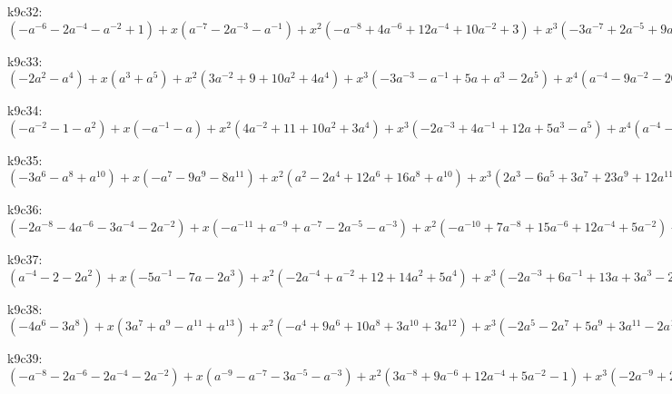 k9c32: $ (-a^{-6}-2a^{-4}-a^{-2}+1) +x(a^{-7}-2a^{-3}-a^{-1}) +x^{2}(-a^{-8}+4a^{-6}+12a^{-4}+10a^{-2}+3) +x^{3}(-3a^{-7}+2a^{-5}+9a^{-3}+3a^{-1}-a) +x^{4}(a^{-8}-6a^{-6}-18a^{-4}-19a^{-2}-8) +x^{5}(3a^{-7}-5a^{-5}-18a^{-3}-9a^{-1}+a) +x^{6}(5a^{-6}+7a^{-4}+6a^{-2}+4) +x^{7}(5a^{-5}+10a^{-3}+5a^{-1}) +x^{8}(2a^{-4}+2a^{-2}) $

k9c33: $ (-2a^{2}-a^{4}) +x(a^{3}+a^{5}) +x^{2}(3a^{-2}+9+10a^{2}+4a^{4}) +x^{3}(-3a^{-3}-a^{-1}+5a+a^{3}-2a^{5}) +x^{4}(a^{-4}-9a^{-2}-20-16a^{2}-6a^{4}) +x^{5}(4a^{-3}-5a^{-1}-16a-6a^{3}+a^{5}) +x^{6}(7a^{-2}+9+5a^{2}+3a^{4}) +x^{7}(6a^{-1}+10a+4a^{3}) +x^{8}(2+2a^{2}) $

k9c34: $ (-a^{-2}-1-a^{2}) +x(-a^{-1}-a) +x^{2}(4a^{-2}+11+10a^{2}+3a^{4}) +x^{3}(-2a^{-3}+4a^{-1}+12a+5a^{3}-a^{5}) +x^{4}(a^{-4}-10a^{-2}-23-19a^{2}-7a^{4}) +x^{5}(4a^{-3}-10a^{-1}-26a-11a^{3}+a^{5}) +x^{6}(8a^{-2}+9+5a^{2}+4a^{4}) +x^{7}(8a^{-1}+14a+6a^{3}) +x^{8}(3+3a^{2}) $

k9c35: $ (-3a^{6}-a^{8}+a^{10}) +x(-a^{7}-9a^{9}-8a^{11}) +x^{2}(a^{2}-2a^{4}+12a^{6}+16a^{8}+a^{10}) +x^{3}(2a^{3}-6a^{5}+3a^{7}+23a^{9}+12a^{11}) +x^{4}(3a^{4}-15a^{6}-15a^{8}+3a^{10}) +x^{5}(4a^{5}-8a^{7}-18a^{9}-6a^{11}) +x^{6}(5a^{6}+a^{8}-4a^{10}) +x^{7}(3a^{7}+4a^{9}+a^{11}) +x^{8}(a^{8}+a^{10}) $

k9c36: $ (-2a^{-8}-4a^{-6}-3a^{-4}-2a^{-2}) +x(-a^{-11}+a^{-9}+a^{-7}-2a^{-5}-a^{-3}) +x^{2}(-a^{-10}+7a^{-8}+15a^{-6}+12a^{-4}+5a^{-2}) +x^{3}(a^{-11}-2a^{-9}+9a^{-5}+6a^{-3}) +x^{4}(2a^{-10}-7a^{-8}-17a^{-6}-12a^{-4}-4a^{-2}) +x^{5}(3a^{-9}-4a^{-7}-14a^{-5}-7a^{-3}) +x^{6}(4a^{-8}+4a^{-6}+a^{-4}+a^{-2}) +x^{7}(3a^{-7}+5a^{-5}+2a^{-3}) +x^{8}(a^{-6}+a^{-4}) $

k9c37: $ (a^{-4}-2-2a^{2}) +x(-5a^{-1}-7a-2a^{3}) +x^{2}(-2a^{-4}+a^{-2}+12+14a^{2}+5a^{4}) +x^{3}(-2a^{-3}+6a^{-1}+13a+3a^{3}-2a^{5}) +x^{4}(a^{-4}-3a^{-2}-13-17a^{2}-8a^{4}) +x^{5}(2a^{-3}-4a^{-1}-13a-6a^{3}+a^{5}) +x^{6}(3a^{-2}+5+5a^{2}+3a^{4}) +x^{7}(3a^{-1}+6a+3a^{3}) +x^{8}(1+a^{2}) $

k9c38: $ (-4a^{6}-3a^{8}) +x(3a^{7}+a^{9}-a^{11}+a^{13}) +x^{2}(-a^{4}+9a^{6}+10a^{8}+3a^{10}+3a^{12}) +x^{3}(-2a^{5}-2a^{7}+5a^{9}+3a^{11}-2a^{13}) +x^{4}(a^{4}-10a^{6}-15a^{8}-10a^{10}-6a^{12}) +x^{5}(3a^{5}-4a^{7}-15a^{9}-7a^{11}+a^{13}) +x^{6}(6a^{6}+6a^{8}+3a^{10}+3a^{12}) +x^{7}(5a^{7}+9a^{9}+4a^{11}) +x^{8}(2a^{8}+2a^{10}) $

k9c39: $ (-a^{-8}-2a^{-6}-2a^{-4}-2a^{-2}) +x(a^{-9}-a^{-7}-3a^{-5}-a^{-3}) +x^{2}(3a^{-8}+9a^{-6}+12a^{-4}+5a^{-2}-1) +x^{3}(-2a^{-9}+2a^{-7}+12a^{-5}+5a^{-3}-3a^{-1}) +x^{4}(-6a^{-8}-13a^{-6}-15a^{-4}-7a^{-2}+1) +x^{5}(a^{-9}-7a^{-7}-18a^{-5}-7a^{-3}+3a^{-1}) +x^{6}(3a^{-8}+3a^{-6}+5a^{-4}+5a^{-2}) +x^{7}(4a^{-7}+9a^{-5}+5a^{-3}) +x^{8}(2a^{-6}+2a^{-4}) $

